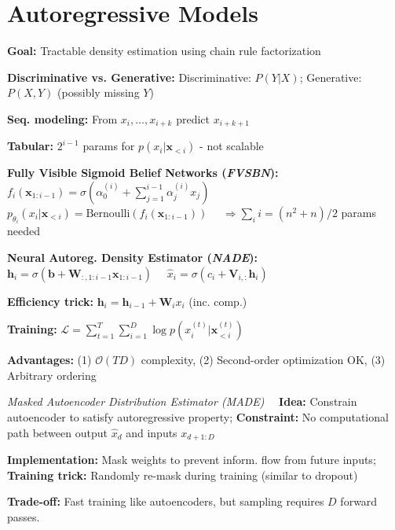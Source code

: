 \section{Autoregressive Models}


\textbf{Goal:} Tractable density estimation using chain rule factorization

\textbf{Discriminative vs. Generative:} Discriminative: $P(Y | X)$; Generative: $P(X, Y)$ (possibly missing $Y$)

\textbf{Seq. modeling:} From $x_i, \ldots, x_{i+k}$ predict $x_{i+k+1}$

\textbf{Tabular:} $2^{i-1}$ params for $p(x_i | \mathbf{x}_{<i})$ - not scalable

\textbf{Fully Visible Sigmoid Belief Networks (\emph{FVSBN}):}
{ \footnotesize
$f_i(\mathbf{x}_{1:i-1}) = \sigma(\alpha_0^{(i)} + \sum_{j=1}^{i-1} \alpha_j^{(i)} x_j) \quad \quad$ 
$p_{\theta_i}(x_i | \mathbf{x}_{<i}) = \text{Bernoulli}(f_i(\mathbf{x}_{1:i-1}))$ $\quad \Rightarrow \sum_i i = (n^2+n)/2$ params needed}

\textbf{Neural Autoreg. Density Estimator (\emph{NADE}):}
{ 
$\mathbf{h}_i = \sigma(\mathbf{b} + \mathbf{W}_{:,1:i-1} \mathbf{x}_{1:i-1})$
$\quad \hat{x}_i = \sigma(c_i + \mathbf{V}_{i,:} \mathbf{h}_i)$ }

{\small
\textbf{Efficiency trick:} $\mathbf{h}_i = \mathbf{h}_{i-1} + \mathbf{W}_i x_i$ (inc. comp.)

\textbf{Training:} $\mathcal{L} = \sum_{t=1}^T \sum_{i=1}^D \log p(x_i^{(t)} | \mathbf{x}_{<i}^{(t)})$

\textbf{Advantages:} (1) $\mathcal{O}(TD)$ complexity, (2) Second-order optimization OK, (3) Arbitrary ordering}


\emph{Masked Autoencoder Distribution Estimator (MADE)}
$\quad $\textbf{Idea:} Constrain autoencoder to satisfy autoregressive property; 
\textbf{Constraint:} No computational path between output $\hat{x}_d$ and inputs $x_{d+1:D}$

\textbf{Implementation:} Mask weights to prevent inform. flow from future inputs; 
\textbf{Training trick:} Randomly re-mask during training (similar to dropout)

\textbf{Trade-off:} Fast training like autoencoders, but sampling requires $D$ forward passes.

